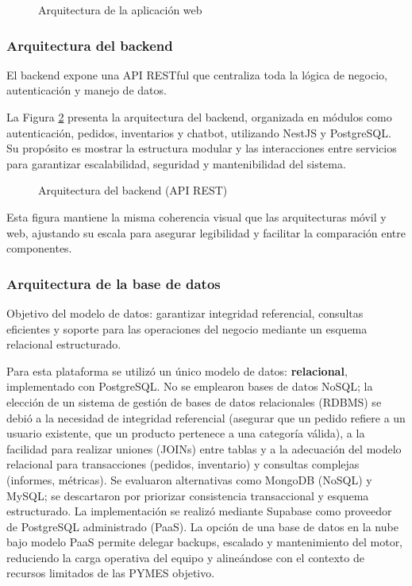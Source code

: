   \begin{figure}[htbp]
  \centering
  \resizebox{0.55\textwidth}{!}{}
  \caption[Arquitectura web]{Arquitectura de la aplicación web}
  \label{fig:web-arquitectura}
  \end{figure}

  \subsubsection{Arquitectura del backend}

  El backend expone una API RESTful que centraliza toda la lógica de negocio, autenticación y manejo de datos.

  La Figura \ref{fig:backend-arquitectura} presenta la arquitectura del backend, organizada en módulos como autenticación, pedidos, inventarios y chatbot, utilizando NestJS y PostgreSQL. Su propósito es mostrar la estructura modular y las interacciones entre servicios para garantizar escalabilidad, seguridad y mantenibilidad del sistema.

  \begin{figure}[htbp]
  \centering
  \resizebox{0.80\textwidth}{!}{}
  \caption[Arquitectura backend]{Arquitectura del backend (API REST)}
  \label{fig:backend-arquitectura}
  \end{figure}

  Esta figura mantiene la misma coherencia visual que las arquitecturas móvil y web, ajustando su escala para asegurar legibilidad y facilitar la comparación entre componentes.



  \clearpage
  \subsubsection{Arquitectura de la base de datos}

  Objetivo del modelo de datos: garantizar integridad referencial, consultas eficientes y soporte para las operaciones del negocio mediante un esquema relacional estructurado.

  Para esta plataforma se utilizó un único modelo de datos: \textbf{relacional}, implementado con PostgreSQL. No se emplearon bases de datos NoSQL; la elección de un sistema de gestión de bases de datos relacionales (RDBMS) se debió a la necesidad de integridad referencial (asegurar que un pedido refiere a un usuario existente, que un producto pertenece a una categoría válida), a la facilidad para realizar uniones (JOINs) entre tablas y a la adecuación del modelo relacional para transacciones (pedidos, inventario) y consultas complejas (informes, métricas). Se evaluaron alternativas como MongoDB (NoSQL) y MySQL; se descartaron por priorizar consistencia transaccional y esquema estructurado. La implementación se realizó mediante Supabase como proveedor de PostgreSQL administrado (PaaS). La opción de una base de datos en la nube bajo modelo PaaS permite delegar backups, escalado y mantenimiento del motor, reduciendo la carga operativa del equipo y alineándose con el contexto de recursos limitados de las PYMES objetivo.

